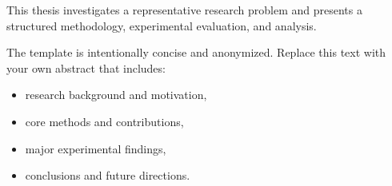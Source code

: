 This thesis investigates a representative research problem and presents a structured methodology, experimental evaluation, and analysis.

The template is intentionally concise and anonymized. Replace this text with your own abstract that includes:
\begin{itemize}
  \item research background and motivation,
  \item core methods and contributions,
  \item major experimental findings,
  \item conclusions and future directions.
\end{itemize}
